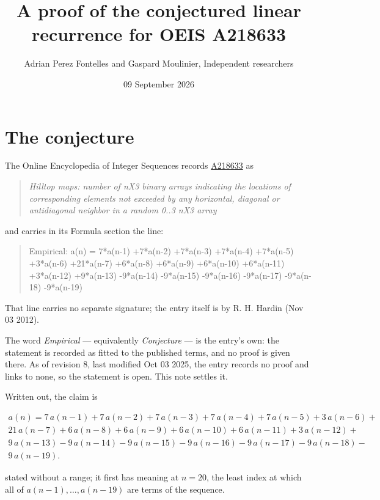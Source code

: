 \documentclass[11pt]{article}
\title{A proof of the conjectured linear recurrence for OEIS A218633}
\author{Adrian Perez Fontelles and Gaspard Moulinier, Independent researchers}
\date{09 September 2026}
\theoremstyle{definition}
\begin{document}
\maketitle
\section{The conjecture}

The Online Encyclopedia of Integer Sequences records \href{https://oeis.org/A218633}{A218633} as

\begin{quote}\itshape Hilltop maps: number of nX3 binary arrays indicating the locations of corresponding elements not exceeded by any horizontal, diagonal or antidiagonal neighbor in a random 0..3 nX3 array\end{quote}

and carries in its Formula section the line:

\begin{quote}\ttfamily Empirical: a(n) = 7*a(n-1) +7*a(n-2) +7*a(n-3) +7*a(n-4) +7*a(n-5) +3*a(n-6) +21*a(n-7) +6*a(n-8) +6*a(n-9) +6*a(n-10) +6*a(n-11) +3*a(n-12) +9*a(n-13) -9*a(n-14) -9*a(n-15) -9*a(n-16) -9*a(n-17) -9*a(n-18) -9*a(n-19)\end{quote}

That line carries no separate signature; the entry itself is by R. H. Hardin (Nov 03 2012).

The word {\itshape Empirical} --- equivalently {\itshape Conjecture} --- is the entry's own: the statement is recorded as fitted to the published terms, and no proof is given there. As of revision 8, last modified Oct 03 2025, the entry records no proof and links to none, so the statement is open. This note settles it.

Written out, the claim is

\begin{multline*} a(n) = 7\,a(n-1) + 7\,a(n-2) + 7\,a(n-3) + 7\,a(n-4) + 7\,a(n-5) + 3\,a(n-6) + \\ 21\,a(n-7) + 6\,a(n-8) + 6\,a(n-9) + 6\,a(n-10) + 6\,a(n-11) + 3\,a(n-12) + \\ 9\,a(n-13) - 9\,a(n-14) - 9\,a(n-15) - 9\,a(n-16) - 9\,a(n-17) - 9\,a(n-18) - \\ 9\,a(n-19). \end{multline*}

stated without a range; it first has meaning at $n = 20$, the least index at which all of $a(n-1),\dots,a(n-19)$ are terms of the sequence.
\end{document}
